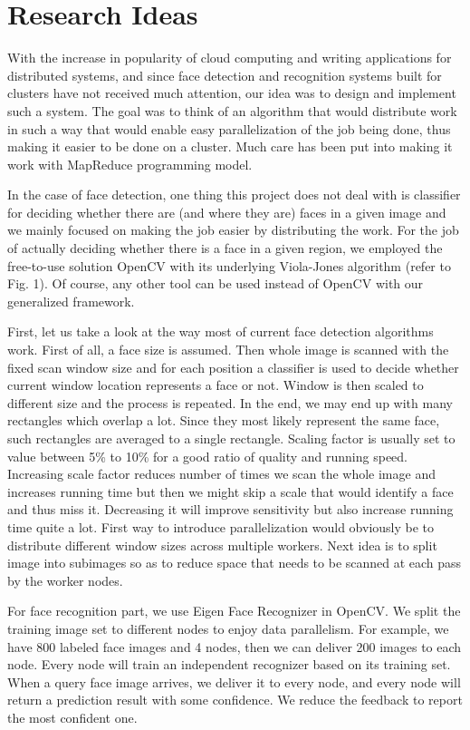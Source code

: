 \documentclass[11pt, draftclsnofoot, onecolumn]{IEEEtran}
\begin{document}
\section{Research Ideas}  \label{sec:ideas}

With the increase in popularity of cloud computing and writing applications for distributed systems, and since face detection and recognition systems built for clusters have not received much attention, our idea was to design and implement such a system. The goal was to think of an algorithm that would distribute work in such a way that would enable easy parallelization of the job being done, thus making it easier to be done on a cluster. Much care has been put into making it work with MapReduce programming model.

In the case of face detection, one thing this project does not deal with is classifier for deciding whether there are (and where they are) faces in a given image and we mainly focused on making the job easier by distributing the work. For the job of actually deciding whether there is a face in a given region, we employed the free-to-use solution OpenCV with its underlying Viola-Jones algorithm (refer to Fig. 1). Of course, any other tool can be used instead of OpenCV with our generalized framework.

First, let us take a look at the way most of current face detection algorithms work. First of all, a face size is assumed. Then whole image is scanned with the fixed scan window size and for each position a classifier is used to decide whether current window location represents a face or not. Window is then scaled to different size and the process is repeated. In the end, we may end up with many rectangles which overlap a lot. Since they most likely represent the same face, such rectangles are averaged to a single rectangle. Scaling factor is usually set to value between 5\% to 10\% for a good ratio of quality and running speed. Increasing scale factor reduces number of times we scan the whole image and increases running time but then we might skip a scale that would identify a face and thus miss it. Decreasing it will improve sensitivity but also increase running time quite a lot. First way to introduce parallelization would obviously be to distribute different window sizes across multiple workers. Next idea is to split image into subimages so as to reduce space that needs to be scanned at each pass by the worker nodes.

For face recognition part, we use Eigen Face Recognizer in OpenCV. We split the training image set to different nodes to enjoy data parallelism. For example, we have 800 labeled face images and 4 nodes, then we can deliver 200 images to each node. Every node will train an independent recognizer based on its training set. When a query face image arrives, we deliver it to every node, and every node will return a prediction result with some confidence. We reduce the feedback to report the most confident one. 
\end{document}
